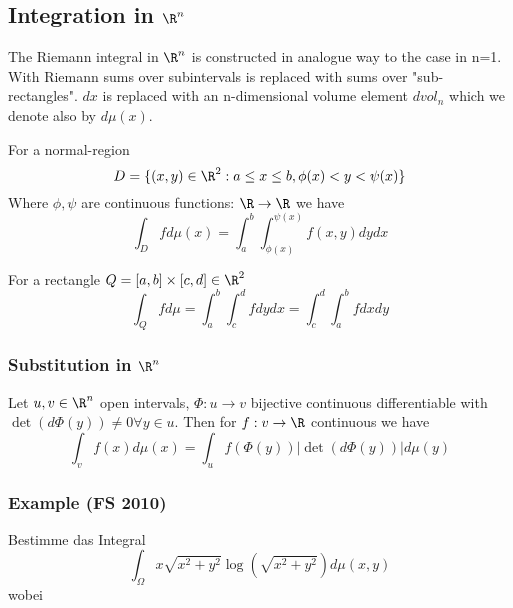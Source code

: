 \documentclass[a4paper]{article}
\begin{document}
\subsection{Integration in $\R^n$}
The Riemann integral in $\R^n$ is constructed in analogue way to the case in n=1. With Riemann sums over subintervals is replaced with sums over "sub-rectangles". $dx$ is replaced with an n-dimensional volume element $dvol_n$ which we denote also by $d\mu(x)$.
\begin{fact}{}
For a normal-region $$D=\{(x,y) \in \R^2 : a\leq x\leq b, \phi (x)<y< \psi (x)\}$$
Where $\phi, \psi$ are continuous functions: $\R \rightarrow \R$ we have
$$\int_D fd\mu(x)= \int_a^b \int_{\phi(x)}^{\psi(x)} f(x,y) dy dx$$ 
\end{fact}

\begin{fact}{}
For a rectangle $Q=[a,b]\times[c,d] \in \R^2$
$$\int_Q f d\mu =\int_a^b \int_c^d f dy dx = \int_c^d \int_a^b f dx dy$$
\end{fact}

\subsubsection{Substitution in $\R^n$}
Let $u,v \in \R^n$ open intervals, $\Phi : u \rightarrow v$ bijective continuous differentiable with $\det(d\Phi (y)) \neq 0 \forall y \in u$. Then for $f: v\rightarrow \R$ continuous we have
$$\int_v f(x) d\mu (x)= \int_u f(\Phi(y)) |\det(d\Phi(y))| d\mu(y)$$   

\subsubsection*{Example (FS 2010)}
Bestimme das Integral 
\[\int_\Omega x\sqrt{x^2+y^2} \log\left(\sqrt{x^2+y^2}\right) d\mu(x,y)\]
wobei 
\begin{center}
\end{center}
\end{document}
